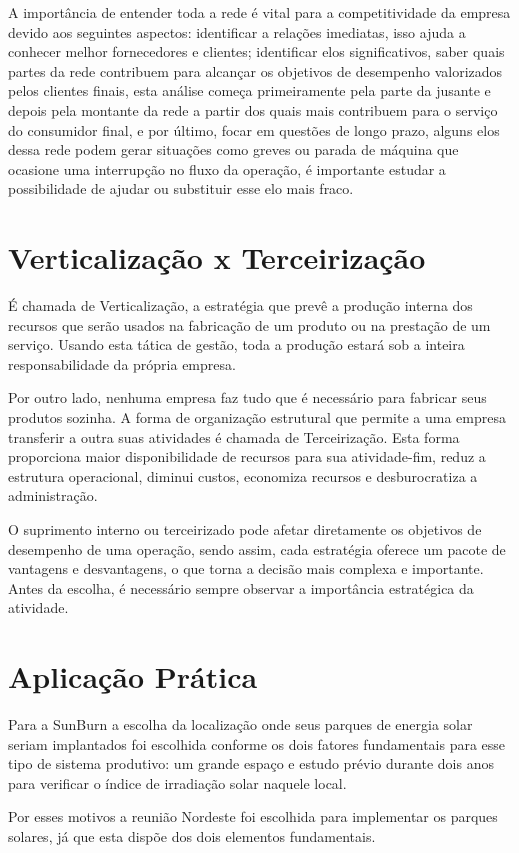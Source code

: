 \par A importância de entender toda a rede é vital para a competitividade da empresa devido aos seguintes aspectos: identificar a relações imediatas, isso ajuda a conhecer melhor fornecedores e clientes; identificar elos significativos, saber quais partes da rede contribuem para alcançar os objetivos de desempenho valorizados pelos clientes finais, esta análise começa primeiramente pela parte da jusante e depois pela montante da rede a partir dos quais mais contribuem para o serviço do consumidor final, e por último, focar em questões de longo prazo, alguns elos dessa rede podem gerar situações como greves ou parada de máquina que ocasione uma interrupção no fluxo da operação, é importante estudar a possibilidade de ajudar ou substituir esse elo mais fraco.


\section{Verticalização x Terceirização}
É chamada de Verticalização, a estratégia que prevê a produção interna dos recursos que serão usados na fabricação de um produto ou na prestação de um serviço. Usando esta tática de gestão, toda a produção estará sob a inteira responsabilidade da própria empresa.

\par Por outro lado, nenhuma empresa faz tudo que é necessário para fabricar seus produtos sozinha. A forma de organização estrutural que permite a uma empresa transferir a outra suas atividades é chamada de Terceirização. Esta forma proporciona maior disponibilidade de recursos para sua atividade-fim, reduz a estrutura operacional, diminui custos, economiza recursos e desburocratiza a administração.

\par O suprimento interno ou terceirizado pode afetar diretamente os objetivos de desempenho de uma operação, sendo assim, cada estratégia oferece um pacote de vantagens e desvantagens, o que torna a decisão mais complexa e importante. Antes da escolha, é necessário sempre observar a importância estratégica da atividade. 


\section{Aplicação Prática} 
\label{sec:projetos_de_novas_aplicacao}
Para a SunBurn a escolha da localização onde seus parques de energia solar seriam implantados foi escolhida conforme os dois fatores fundamentais para esse tipo de sistema produtivo: um grande espaço e estudo prévio durante dois anos para verificar o índice de irradiação solar naquele local. 
\par Por esses motivos a reunião Nordeste foi escolhida para implementar os parques solares, já que esta dispõe dos dois elementos fundamentais.

